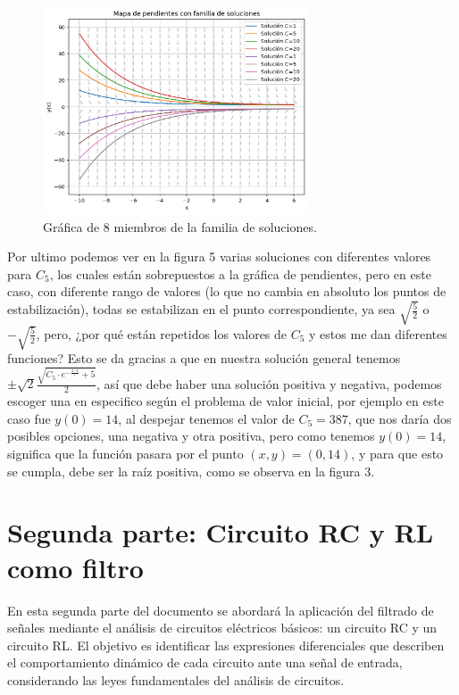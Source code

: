 \documentclass{article}
\begin{document}
\begin{figure}[H]
    \centering
    \includegraphics[width=0.7\textwidth]{Grafica_MSoluciones.png}
    \caption{Gráfica de 8 miembros de la familia de soluciones.}
    \label{fig:Familia_Soluciones}
\end{figure}

Por ultimo podemos ver en la figura 5 varias soluciones con diferentes valores para \(C_5\), los cuales están sobrepuestos a la gráfica de pendientes, pero en este caso, con diferente rango de valores (lo que no cambia en absoluto los puntos de estabilización), todas se estabilizan en el punto correspondiente, ya sea \(\sqrt{\frac{5}{2}}\) o \(-\sqrt{\frac{5}{2}}\), pero, ¿por qué están repetidos los valores de \(C_5\) y estos me dan diferentes funciones? 
Esto se da gracias a que en nuestra solución general tenemos \(\pm\sqrt{2}\frac{\sqrt{C_5\cdot e^{-\frac{4\cdot x}{7}}+5}}{2}\), así que debe haber una solución positiva y negativa, podemos escoger una en especifico según el problema de valor inicial, por ejemplo en este caso fue \(y(0)=14\), al despejar tenemos el valor de \(C_5=387\), que nos daría dos posibles opciones, una negativa y otra positiva, pero como tenemos \(y(0)=14\), significa que la función pasara por el punto \((x,y)=(0,14)\), y para que esto se cumpla, debe ser la raíz positiva, como se observa en la figura 3.

\section{Segunda parte: Circuito RC y RL como filtro}
En esta segunda parte del documento se abordará la aplicación del filtrado de señales mediante el análisis de circuitos eléctricos básicos: un circuito RC y un circuito RL. El objetivo es identificar las expresiones diferenciales que describen el comportamiento dinámico de cada circuito ante una señal de entrada, considerando las leyes fundamentales del análisis de circuitos.
\end{document}
